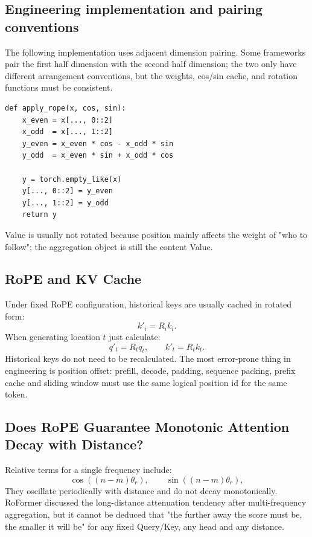 \documentclass[UTF8,fontset=none,a4paper,10pt]{ctexart}
\begin{document}
\subsection{Engineering implementation and pairing conventions}

The following implementation uses adjacent dimension pairing. Some frameworks pair the first half dimension with the second half dimension; the two only have different arrangement conventions, but the weights, cos/sin cache, and rotation functions must be consistent.

\begin{lstlisting}
def apply_rope(x, cos, sin):
    x_even = x[..., 0::2]
    x_odd  = x[..., 1::2]
    y_even = x_even * cos - x_odd * sin
    y_odd  = x_even * sin + x_odd * cos

    y = torch.empty_like(x)
    y[..., 0::2] = y_even
    y[..., 1::2] = y_odd
    return y
\end{lstlisting}

Value is usually not rotated because position mainly affects the weight of "who to follow"; the aggregation object is still the content Value.

\subsection{RoPE and KV Cache}

Under fixed RoPE configuration, historical keys are usually cached in rotated form:
\begin{equation}
  k'_i=R_i k_i.
  \label{en:eq:cached-key}
\end{equation}
When generating location $t$ just calculate:
\begin{equation}
  q'_t=R_tq_t,\qquad k'_t=R_tk_t.
  \label{en:eq:decode-rope}
\end{equation}
Historical keys do not need to be recalculated. The most error-prone thing in engineering is position offset: prefill, decode, padding, sequence packing, prefix cache and sliding window must use the same logical position id for the same token.

\subsection{Does RoPE Guarantee Monotonic Attention Decay with Distance?}

Relative terms for a single frequency include:
\begin{equation}
  \cos((n-m)\theta_r),\qquad \sin((n-m)\theta_r),
  \label{en:eq:rope-oscillation}
\end{equation}
They oscillate periodically with distance and do not decay monotonically. RoFormer discussed the long-distance attenuation tendency \cite{en:su2021} after multi-frequency aggregation, but it cannot be deduced that "the further away the score must be, the smaller it will be" for any fixed Query/Key, any head and any distance.
\end{document}
